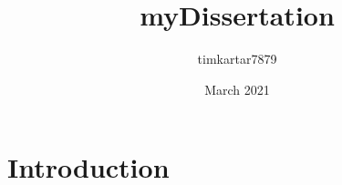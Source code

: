 \documentclass{article}
\title{myDissertation}
\author{timkartar7879 }
\date{March 2021}
\begin{document}
\maketitle

\section{Introduction}
\end{document}
